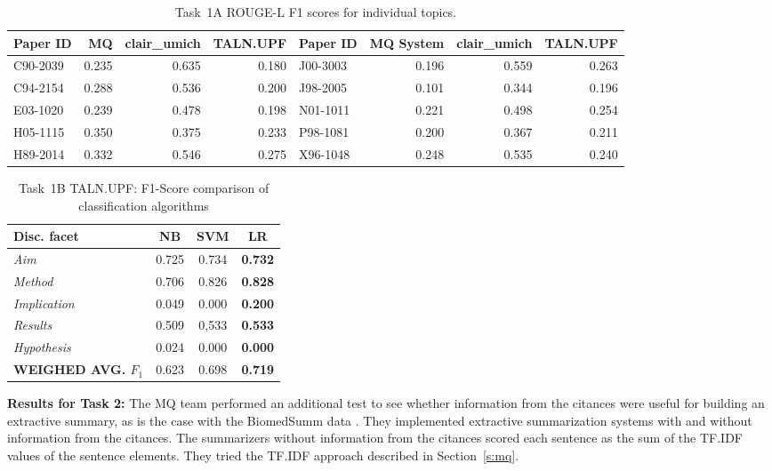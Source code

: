 \documentclass[11pt]{article}
\begin{document}
\begin{table*}
  \centering
  \begin{tabular}{|l|r|r|r||l|r|r|r|}
  	\hline
	Paper ID & MQ  & clair\_umich & TALN.UPF & Paper ID & MQ System & clair\_umich & TALN.UPF\\
	\hline
	C90-2039 & 0.235 & 0.635 & 0.180 & J00-3003 & 0.196 & 0.559& 0.263\\
	C94-2154 & 0.288 & 0.536 & 0.200 & J98-2005 & 0.101 & 0.344& 0.196\\
	E03-1020 & 0.239 & 0.478 & 0.198 & N01-1011 & 0.221 & 0.498& 0.254\\
	H05-1115 & 0.350 & 0.375 & 0.233 & P98-1081 & 0.200 & 0.367& 0.211\\
	H89-2014 & 0.332 & 0.546 & 0.275 & X96-1048 & 0.248 & 0.535& 0.240\\
	\hline
  \end{tabular}
\caption{Task~1A ROUGE-L F1 scores for individual topics.}
\label{tab:task1av2}
\end{table*}

\begin{table}[h]\footnotesize
  \begin{center}
  \begin{tabular}{ | l | c | c | c |}
    \hline
    Disc. facet & NB & SVM & \textbf{LR} \\ \hline
    \textit{Aim} & 0.725 & 0.734 & \textbf{0.732} \\ \hline
    \textit{Method} & 0.706 & 0.826 & \textbf{0.828} \\ \hline
    \textit{Implication} & 0.049 & 0.000 & \textbf{0.200} \\ \hline
    \textit{Results} & 0.509 & 0,533 & \textbf{0.533} \\ \hline
    \textit{Hypothesis} & 0.024 & 0.000 &\textbf{ 0.000} \\ \hline
    \textbf{WEIGHED AVG. $F_1$} & 0.623 & 0.698 & \textbf{0.719} \\ \hline
    \hline
  \end{tabular}
  \caption{ Task~1B TALN.UPF: F1-Score comparison of classification algorithms}
  \label{table:task1bAlgorithmComp}
  \end{center}
\end{table}

\textbf{Results for Task 2:} The MQ team performed an additional test to see 
whether information from the citances were useful for building an extractive 
summary, as is the case with the BiomedSumm data \cite{Molla:ALTA2014}. 
They implemented extractive summarization systems with and without information 
from the citances.  The summarizers without information from the citances scored 
each sentence as the sum of the TF.IDF values of the sentence 
elements. They tried the TF.IDF approach described in Section~\ref{s:mq}.
\end{document}
